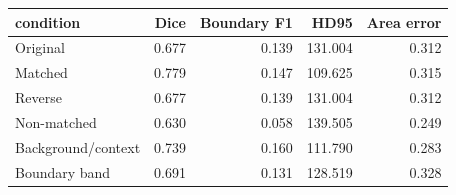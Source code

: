 \begin{tabular}{lrrrr}
\toprule
condition & Dice & Boundary F1 & HD95 & Area error \\
\midrule
Original & 0.677 & 0.139 & 131.004 & 0.312 \\
Matched & 0.779 & 0.147 & 109.625 & 0.315 \\
Reverse & 0.677 & 0.139 & 131.004 & 0.312 \\
Non-matched & 0.630 & 0.058 & 139.505 & 0.249 \\
Background/context & 0.739 & 0.160 & 111.790 & 0.283 \\
Boundary band & 0.691 & 0.131 & 128.519 & 0.328 \\
\bottomrule
\end{tabular}
